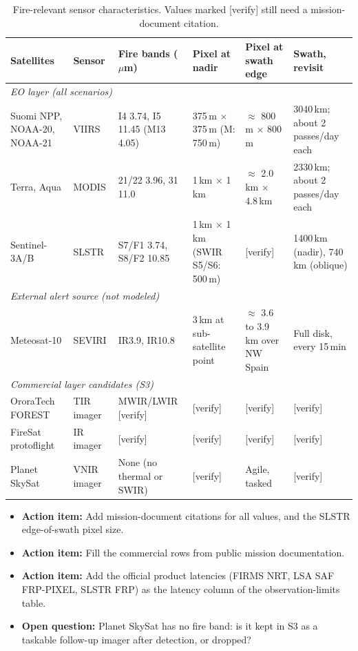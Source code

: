 \documentclass[11pt]{article}
\newcommand{\openquestion}[1]{\textcolor{openq}{\textbf{Open question:}} #1}
\newcommand{\actionitem}[1]{\textcolor{todo}{\textbf{Action item:}} #1}
\begin{document}
\begin{longtable}{p{2.5cm}p{1.4cm}p{2.4cm}p{2.0cm}p{2.2cm}p{2.6cm}}
\caption{Fire-relevant sensor characteristics. Values marked [verify] still need a mission-document citation.}\label{tab:sensors}\\
\toprule
\textbf{Satellites} & \textbf{Sensor} & \textbf{Fire bands ($\mu$m)} & \textbf{Pixel at nadir} & \textbf{Pixel at swath edge} & \textbf{Swath, revisit} \\
\midrule
\endhead
\multicolumn{6}{l}{\textit{EO layer (all scenarios)}} \\
Suomi NPP, NOAA-20, NOAA-21 & VIIRS & I4 3.74, I5 11.45 (M13 4.05) & 375\,m $\times$ 375\,m (M: 750\,m) & $\approx$ 800\,m $\times$ 800\,m & 3040\,km; about 2 passes/day each \\
Terra, Aqua & MODIS & 21/22 3.96, 31 11.0 & 1\,km $\times$ 1\,km & $\approx$ 2.0\,km $\times$ 4.8\,km & 2330\,km; about 2 passes/day each \\
Sentinel-3A/B & SLSTR & S7/F1 3.74, S8/F2 10.85 & 1\,km $\times$ 1\,km (SWIR S5/S6: 500\,m) & [verify] & 1400\,km (nadir), 740\,km (oblique) \\
\multicolumn{6}{l}{\textit{External alert source (not modeled)}} \\
Meteosat-10 & SEVIRI & IR3.9, IR10.8 & 3\,km at sub-satellite point & $\approx$ 3.6 to 3.9\,km over NW Spain & Full disk, every 15\,min \\
\multicolumn{6}{l}{\textit{Commercial layer candidates (S3)}} \\
OroraTech FOREST & TIR imager & MWIR/LWIR [verify] & [verify] & [verify] & [verify] \\
FireSat protoflight & IR imager & [verify] & [verify] & [verify] & [verify] \\
Planet SkySat & VNIR imager & None (no thermal or SWIR) & [verify] & Agile, tasked & [verify] \\
\bottomrule
\end{longtable}

\begin{itemize}[leftmargin=1.2cm]
    \item \actionitem{Add mission-document citations for all values, and the SLSTR edge-of-swath pixel size.}
    \item \actionitem{Fill the commercial rows from public mission documentation.}
    \item \actionitem{Add the official product latencies (FIRMS NRT, LSA SAF FRP-PIXEL, SLSTR FRP) as the latency column of the observation-limits table.}
    \item \openquestion{Planet SkySat has no fire band: is it kept in S3 as a taskable follow-up imager after detection, or dropped?}
\end{itemize}
\end{document}
